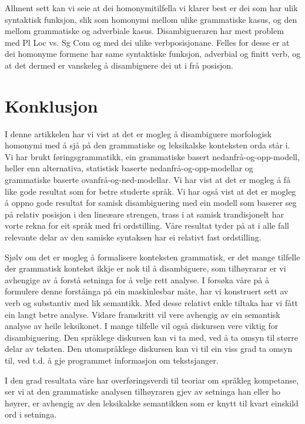\documentclass[a4paper,nynorsk]{article}
\begin{document}
Allment sett kan vi seie at dei homonymitilfella vi klarer best er dei som har ulik syntaktisk funksjon, slik som homonymi mellom ulike grammatiske kasus, og den mellom grammatiske og adverbiale kasus. Disambigueraren har mest problem med Pl Loc vs. Sg Com og med dei ulike verbposisjonane. Felles for desse er at dei homonyme formene har same syntaktiske funksjon, adverbial og finitt verb, og at det dermed er vanskeleg å disambiguere dei ut i frå posisjon.

\section{Konklusjon}


I denne artikkelen har vi vist at det er mogleg å disambiguere morfologisk homonymi med å sjå på den grammatiske og leksikalske konteksten orda står i. Vi har brukt føringsgrammatikk, ein grammatiske basert nedanfrå-og-opp-modell, heller enn alternativa, statistisk baserte nedanfrå-og-opp-modellar og grammatiske baserte ovanfrå-og-ned-modellar. Vi har vist at det er mogleg å få like gode resultat som for betre studerte språk. Vi har også vist at det er mogleg å oppno gode resultat for samisk disambiguering med ein modell som baserer seg på relativ posisjon i den lineæare strengen, trass i at samisk trandisjonelt har vorte rekna for eit språk med fri ordstilling. Våre resultat tyder på at i alle fall relevante delar av den samiske syntaksen har ei relativt fast ordstilling.  %

Sjølv om det er mogleg å formalisere konteksten grammatisk, er det mange tilfelle der grammatisk kontekst ikkje er nok til å disambiguere, som tilhøyrarar er vi avhengige av å forstå setninga for å velje rett analyse. I forsøka våre på å formulere denne forståinga på ein maskinlesbar måte, har vi konstruert sett av verb og substantiv med lik semantikk. Med desse relativt enkle tiltaka har vi fått ein langt betre analyse. Vidare framskritt vil vere avhengig av ein semantisk analyse av heile leksikonet. I mange tilfelle vil også diskursen vere viktig for disambiguering. Den språklege diskursen kan vi ta med, ved å ta omsyn til større delar av teksten. Den utomspråklege diskursen kan vi til ein viss grad ta omsyn til, ved t.d. å gje programmet informasjon om tekstsjanger. %

I den grad resultata våre har overføringsverdi til teoriar om språkleg kompetanse, ser vi at den grammatiske analysen tilhøyraren gjev av setninga han eller ho høyrer, er avhengig av den leksikalske semantikken som er knytt til kvart einskild ord i setninga. %




%
\end{document}

